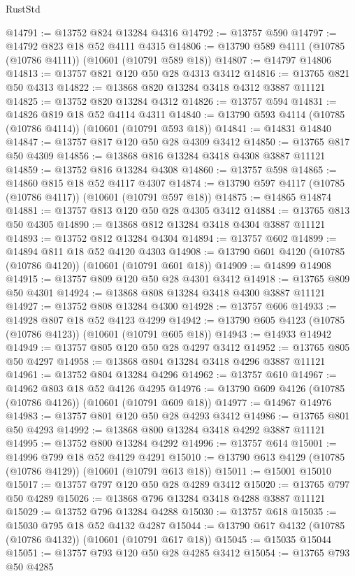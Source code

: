 \begin{lexlean}{RustStd}
\begin{coremodule}
@14791 := @13752 @824 @13284 @4316
@14792 := @13757 @590
@14797 := @14792 @823 @18 @52 @4111 @4315
@14806 := @13790 @589 @4111 (@10785 (@10786 @4111)) (@10601 (@10791 @589 @18))
@14807 := @14797 @14806
@14813 := @13757 @821 @120 @50 @28 @4313 @3412
@14816 := @13765 @821 @50 @4313
@14822 := @13868 @820 @13284 @3418 @4312 @3887 @11121
@14825 := @13752 @820 @13284 @4312
@14826 := @13757 @594
@14831 := @14826 @819 @18 @52 @4114 @4311
@14840 := @13790 @593 @4114 (@10785 (@10786 @4114)) (@10601 (@10791 @593 @18))
@14841 := @14831 @14840
@14847 := @13757 @817 @120 @50 @28 @4309 @3412
@14850 := @13765 @817 @50 @4309
@14856 := @13868 @816 @13284 @3418 @4308 @3887 @11121
@14859 := @13752 @816 @13284 @4308
@14860 := @13757 @598
@14865 := @14860 @815 @18 @52 @4117 @4307
@14874 := @13790 @597 @4117 (@10785 (@10786 @4117)) (@10601 (@10791 @597 @18))
@14875 := @14865 @14874
@14881 := @13757 @813 @120 @50 @28 @4305 @3412
@14884 := @13765 @813 @50 @4305
@14890 := @13868 @812 @13284 @3418 @4304 @3887 @11121
@14893 := @13752 @812 @13284 @4304
@14894 := @13757 @602
@14899 := @14894 @811 @18 @52 @4120 @4303
@14908 := @13790 @601 @4120 (@10785 (@10786 @4120)) (@10601 (@10791 @601 @18))
@14909 := @14899 @14908
@14915 := @13757 @809 @120 @50 @28 @4301 @3412
@14918 := @13765 @809 @50 @4301
@14924 := @13868 @808 @13284 @3418 @4300 @3887 @11121
@14927 := @13752 @808 @13284 @4300
@14928 := @13757 @606
@14933 := @14928 @807 @18 @52 @4123 @4299
@14942 := @13790 @605 @4123 (@10785 (@10786 @4123)) (@10601 (@10791 @605 @18))
@14943 := @14933 @14942
@14949 := @13757 @805 @120 @50 @28 @4297 @3412
@14952 := @13765 @805 @50 @4297
@14958 := @13868 @804 @13284 @3418 @4296 @3887 @11121
@14961 := @13752 @804 @13284 @4296
@14962 := @13757 @610
@14967 := @14962 @803 @18 @52 @4126 @4295
@14976 := @13790 @609 @4126 (@10785 (@10786 @4126)) (@10601 (@10791 @609 @18))
@14977 := @14967 @14976
@14983 := @13757 @801 @120 @50 @28 @4293 @3412
@14986 := @13765 @801 @50 @4293
@14992 := @13868 @800 @13284 @3418 @4292 @3887 @11121
@14995 := @13752 @800 @13284 @4292
@14996 := @13757 @614
@15001 := @14996 @799 @18 @52 @4129 @4291
@15010 := @13790 @613 @4129 (@10785 (@10786 @4129)) (@10601 (@10791 @613 @18))
@15011 := @15001 @15010
@15017 := @13757 @797 @120 @50 @28 @4289 @3412
@15020 := @13765 @797 @50 @4289
@15026 := @13868 @796 @13284 @3418 @4288 @3887 @11121
@15029 := @13752 @796 @13284 @4288
@15030 := @13757 @618
@15035 := @15030 @795 @18 @52 @4132 @4287
@15044 := @13790 @617 @4132 (@10785 (@10786 @4132)) (@10601 (@10791 @617 @18))
@15045 := @15035 @15044
@15051 := @13757 @793 @120 @50 @28 @4285 @3412
@15054 := @13765 @793 @50 @4285

\end{coremodule}
\end{lexlean}
